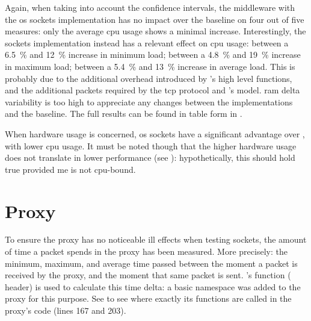 Again, when taking into account the confidence intervals, the \gls{middleware} with the \gls{os} sockets implementation has no impact over the baseline on four out of five measures: only the average \gls{cpu} usage shows a minimal increase. Interestingly, the  sockets implementation instead has a relevant effect on \gls{cpu} usage: between a \SI{6,5}{\percent} and \SI{12}{\percent} increase in minimum load; between a \SI{4,8}{\percent} and \SI{19}{\percent} increase in maximum load; between a \SI{5,4}{\percent} and \SI{13}{\percent} increase in average load. This is probably due to the additional overhead introduced by 's high level functions, and the additional \glspl{packet} required by the \gls{tcp} protocol and 's  model. \gls{ram} delta variability is too high to appreciate any changes between the implementations and the baseline.  The full results can be found in table form in .

When hardware usage is concerned, \gls{os} sockets have a significant advantage over , with lower \gls{cpu} usage. It must be noted though that the higher hardware usage does not translate in lower performance (see ): hypothetically, this should hold true provided \gls{me} is not \gls{cpu}-bound.

\section{Proxy}\label{sc:performance:proxy}



To ensure the \gls{proxy} has no noticeable ill effects when testing  sockets, the amount of time a \gls{packet} spends in the \gls{proxy} has been measured. More precisely: the minimum, maximum, and average time passed between the moment a \gls{packet} is received by the \gls{proxy}, and the moment that same \gls{packet} is sent. 's  function ( header) is used to calculate this time delta: a basic  namespace was added to the proxy for this purpose. See  to see where exactly its functions are called in the \gls{proxy}'s code (lines \num{167} and \num{203}).

